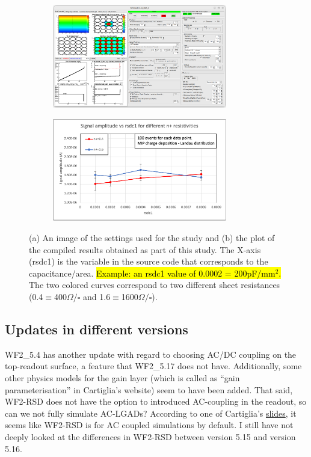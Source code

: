 \documentclass[11pt]{article}
\newcommand{\hlyellow}[1]{{\sethlcolor{yellow}\hl{#1}}}
\begin{document}
\begin{figure}[h!]
    \centering
    \begin{subfigure}[t]{0.49\textwidth}
        \centering
        \includegraphics[width=3in]{Images/recreate_kita_amp_vs_ccp_other_settings.png}
        \caption{}
        \label{fig:recreate_kita_amp_vs_ccp_other_settings}
    \end{subfigure}%
    \begin{subfigure}[t]{0.49\textwidth}
        \centering
        \includegraphics[width=3in]{Images/recreate_kita_amp_vs_ccp_plot.png}
        \caption{}
        \label{fig:recreate_kita_amp_vs_ccp_plot}
    \end{subfigure}
    \caption{(a) An image of the settings used for the study and (b) the plot of the compiled results obtained as part of this study. The X-axis (rsdc1) is the variable in the source code that corresponds to the capacitance/area. \hlyellow{Example: an rsdc1 value of 0.0002 = 200pF/mm$^2$.} The two colored curves correspond to two different sheet resistances (0.4$\equiv$400$\Omega/\square$ and 1.6$\equiv$1600$\Omega/\square$).}
    \label{fig:recreate_kita_amp_vs_ccp}
\end{figure}

\subsection{Updates in different versions}
WF2\_5.4 has another update with regard to choosing AC/DC coupling on the top-readout surface, a feature that WF2\_5.17 does not have. Additionally, some other physics models for the gain layer (which is called as ``gain parameterisation'' in Cartiglia's website) seem to have been added.
\newline
That said, WF2-RSD does not have the option to introduced AC-coupling in the readout, so can we not fully simulate AC-LGADs? According to one of Cartiglia's \href{https://indico.cern.ch/event/928957/contributions/3913535/attachments/2069369/3473666/FCCee_Cartiglia.pdf}{slides}, it seems like WF2-RSD is for AC coupled simulations by default.
\newline
I still have not deeply looked at the differences in WF2-RSD between version 5.15 and version 5.16.


\end{document}
